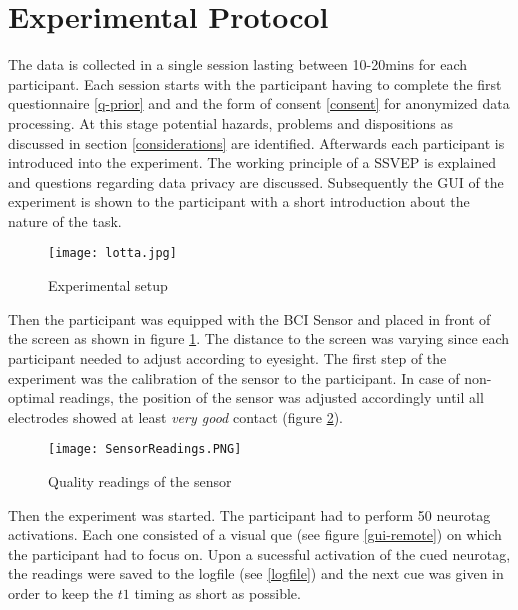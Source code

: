        \section{Experimental Protocol}

            The data is collected in a single session lasting between 10-20mins for each participant. Each session starts with the participant having to complete the first questionnaire \ref*{q-prior} and and the form of consent \ref*{consent} for anonymized data processing. At this stage potential hazards, problems and dispositions as discussed in section \ref{considerations} are identified.
            Afterwards each participant is introduced into the experiment. The working principle of a SSVEP is explained and questions regarding data privacy are discussed. Subsequently the GUI of the experiment is shown to the participant with a short introduction about the nature of the task.

            \begin{figure}[h]     %
                \centering
                \texttt{[image: lotta.jpg]} 
                \caption{Experimental setup}\label{experimental-setup}
            \end{figure}            

            Then the participant was equipped with the BCI Sensor and placed in front of the screen as shown in figure \ref*{experimental-setup}. The distance to the screen was varying since each participant needed to adjust according to eyesight. The first step of the experiment was the calibration of the sensor to the participant. In case of non-optimal readings, the position of the sensor was adjusted accordingly until all electrodes showed at least \textit{very good} contact (figure \ref*{electrode-quality}).

            \begin{figure}[h]     %
                \centering
                \texttt{[image: SensorReadings.PNG]} 
                \caption{Quality readings of the sensor}\label{electrode-quality}
            \end{figure}

            Then the experiment was started. The participant had to perform 50 neurotag activations. Each one consisted of a visual que (see figure \ref*{gui-remote}) on which the participant had to focus on. Upon a sucessful activation of the cued neurotag, the readings were saved to the logfile (see \ref*{logfile}) and the next cue was given in order to keep the $t1$ timing as short as possible.

